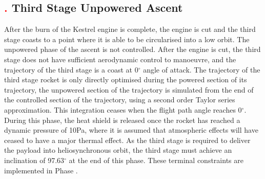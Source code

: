 \subsection{\textcolor{red}{.} Third Stage Unpowered Ascent}
After the burn of the Kestrel engine is complete, the engine is cut and the third stage coasts to a point where it is able to be circularised into a low orbit. 
The unpowered phase of the ascent is not controlled. After the engine is cut, the third stage does not have sufficient aerodynamic control to manoeuvre, and the trajectory of the third stage is a coast at 0$^\circ$ angle of attack. The trajectory of the third stage rocket is only directly optimised during the powered section of its trajectory, the unpowered section of the trajectory is simulated from the end of the controlled section of the trajectory, using a second order Taylor series approximation. This integration ceases when the flight path angle reaches 0$^{\circ}$.
During this phase, the heat shield is released once the rocket has reached a dynamic pressure of 10Pa, where it is assumed that atmospheric effects will have ceased to have a major thermal effect.  As the third stage is required to deliver the payload into heliosynchronous orbit, the third stage must achieve an inclination of 97.63$^\circ$ at the end of this phase\cite{Boain2004}. These terminal constraints are implemented in Phase .




